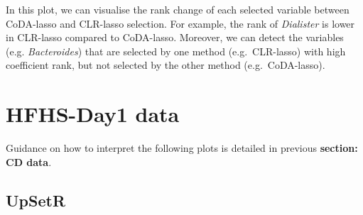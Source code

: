 \documentclass[openany]{book}
\begin{document}
In this plot, we can visualise the rank change of each selected variable
between CoDA-lasso and CLR-lasso selection. For example, the rank of
\emph{Dialister} is lower in CLR-lasso compared to CoDA-lasso. Moreover,
we can detect the variables (e.g. \emph{Bacteroides}) that are selected
by one method (e.g.~CLR-lasso) with high coefficient rank, but not
selected by the other method (e.g.~CoDA-lasso).

\section{HFHS-Day1 data}\label{hfhs-day1-data-3}

Guidance on how to interpret the following plots is detailed in previous
\textbf{section: CD data}.

\subsection{UpSetR}\label{upsetr-1}
\end{document}
